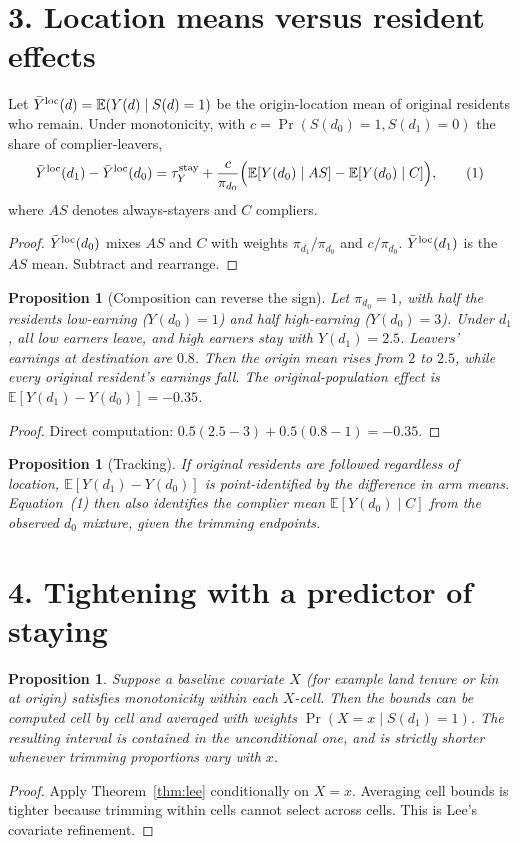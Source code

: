 \documentclass[11pt]{article}
\newtheorem{proposition}[theorem]{Proposition}
\theoremstyle{definition}
\begin{document}
\section*{3. Location means versus resident effects}
Let $\bar Y^{\rm loc}(d)=\mathbb E(Y(d)\mid S(d)=1)$ be the origin-location mean of original residents who remain. Under
monotonicity, with $c=\Pr(S(d_0)=1,S(d_1)=0)$ the share of complier-leavers,
\[
 \bar Y^{\rm loc}(d_1)-\bar Y^{\rm loc}(d_0)=\tau^{\rm stay}_Y+\frac{c}{\pi_{d_0}}\Bigl(\mathbb E[Y(d_0)\mid AS]-\mathbb E[Y(d_0)\mid C]\Bigr),\tag{1}
\]
where $AS$ denotes always-stayers and $C$ compliers.
\begin{proof}
$\bar Y^{\rm loc}(d_0)$ mixes $AS$ and $C$ with weights $\pi_{d_1}/\pi_{d_0}$ and $c/\pi_{d_0}$. $\bar Y^{\rm loc}(d_1)$ is
the $AS$ mean. Subtract and rearrange.
\end{proof}
\begin{proposition}[Composition can reverse the sign]\label{prop:rev}
Let $\pi_{d_0}=1$, with half the residents low-earning ($Y(d_0)=1$) and half high-earning ($Y(d_0)=3$). Under $d_1$,
all low earners leave, and high earners stay with $Y(d_1)=2.5$. Leavers' earnings at destination are $0.8$. Then the
origin mean rises from $2$ to $2.5$, while every original resident's earnings fall. The original-population effect is
$\mathbb E[Y(d_1)-Y(d_0)]=-0.35$.
\end{proposition}
\begin{proof}
Direct computation: $0.5(2.5-3)+0.5(0.8-1)=-0.35$.
\end{proof}
\begin{proposition}[Tracking]
If original residents are followed regardless of location, $\mathbb E[Y(d_1)-Y(d_0)]$ is point-identified by the difference
in arm means. Equation~(1) then also identifies the complier mean $\mathbb E[Y(d_0)\mid C]$ from the observed $d_0$
mixture, given the trimming endpoints.
\end{proposition}

\section*{4. Tightening with a predictor of staying}
\begin{proposition}\label{prop:cov}
Suppose a baseline covariate $X$ (for example land tenure or kin at origin) satisfies monotonicity within each $X$-cell.
Then the bounds can be computed cell by cell and averaged with weights $\Pr(X=x\mid S(d_1)=1)$. The resulting interval is
contained in the unconditional one, and is strictly shorter whenever trimming proportions vary with $x$.
\end{proposition}
\begin{proof}
Apply Theorem~\ref{thm:lee} conditionally on $X=x$. Averaging cell bounds is tighter because trimming within cells cannot
select across cells. This is Lee's covariate refinement.
\end{proof}
\end{document}
